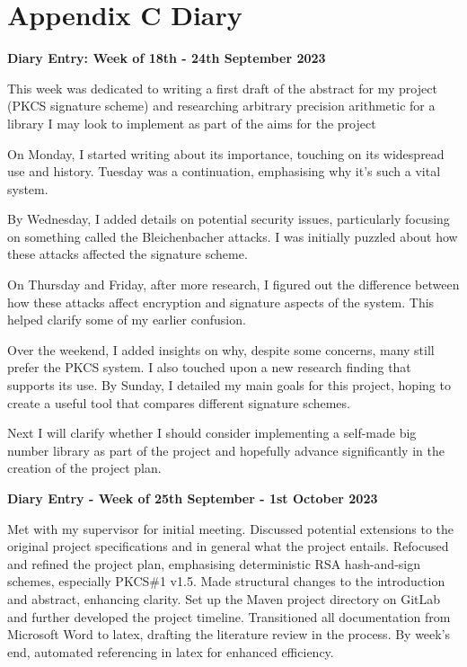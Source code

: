 \documentclass[]{final_report}
\theoremstyle{definition}
\begin{document}
\chapter{Appendix C Diary}

\textbf{Diary Entry: Week of 18th - 24th September 2023}

This week was dedicated to writing a first draft of the abstract for my project (PKCS signature scheme) and researching arbitrary precision arithmetic for a library I may look to implement as part of the aims for the project

On Monday, I started writing about its importance, touching on its widespread use and history.
Tuesday was a continuation, emphasising why it's such a vital system.

By Wednesday, I added details on potential security issues, particularly focusing on something
called the Bleichenbacher attacks. I was initially puzzled about how these attacks affected the
signature scheme.

On Thursday and Friday, after more research, I figured out the difference between how these attacks
affect encryption and signature aspects of the system. This helped clarify some of my earlier
confusion.

Over the weekend, I added insights on why, despite some concerns, many still prefer the PKCS system.
I also touched upon a new research finding that supports its use. By Sunday, I detailed my main
goals for this project, hoping to create a useful tool that compares different signature schemes.

Next I will clarify whether I should consider implementing a self-made big number library as part of
the project and hopefully advance significantly in the creation of the project plan.

\textbf{Diary Entry - Week of 25th September - 1st October 2023}

Met with my supervisor for initial meeting. Discussed potential extensions to the original project
specifications and in general what the project entails. Refocused and refined the project plan,
emphasising deterministic RSA hash-and-sign schemes, especially PKCS\#1 v1.5. Made structural changes
to the introduction and abstract, enhancing clarity. Set up the Maven project directory on GitLab
and further developed the project timeline. Transitioned all documentation from Microsoft Word to
latex, drafting the literature review in the process. By week's end, automated referencing in latex
for enhanced efficiency.
\end{document}
